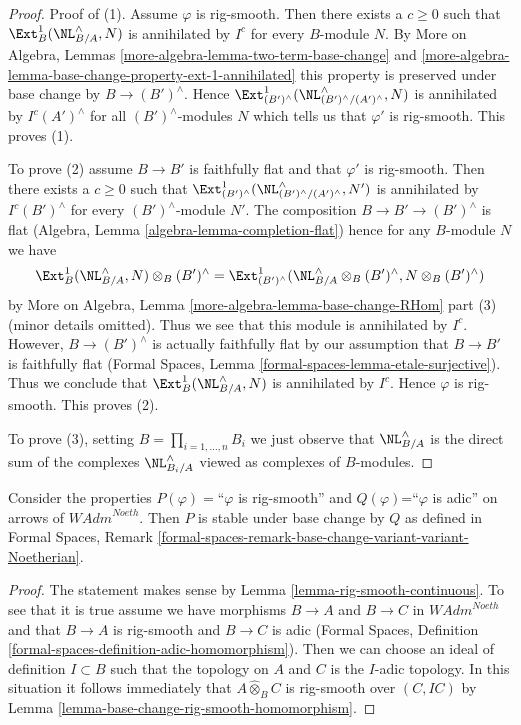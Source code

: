 \begin{proof}
\medskip\noindent
Proof of (1). Assume $\varphi$ is rig-smooth. Then there exists a $c \geq 0$
such that $\Ext^1_B(\NL_{B/A}^\wedge, N)$ is annihilated by $I^c$
for every $B$-module $N$. By
More on Algebra, Lemmas \ref{more-algebra-lemma-two-term-base-change} and
\ref{more-algebra-lemma-base-change-property-ext-1-annihilated}
this property is preserved under base change by $B \to (B')^\wedge$.
Hence $\Ext^1_{(B')^\wedge}(\NL_{(B')^\wedge/(A')^\wedge}^\wedge, N)$
is annihilated by $I^c(A')^\wedge$ for all $(B')^\wedge$-modules $N$
which tells us that $\varphi'$ is rig-smooth.
This proves (1).

\medskip\noindent
To prove (2) assume $B \to B'$ is faithfully flat and that $\varphi'$
is rig-smooth. Then there exists a $c \geq 0$ such that
$\Ext^1_{(B')^\wedge}(\NL_{(B')^\wedge/(A')^\wedge}^\wedge, N')$
is annihilated by $I^c(B')^\wedge$ for every $(B')^\wedge$-module $N'$.
The composition $B \to B' \to (B')^\wedge$ is flat
(Algebra, Lemma \ref{algebra-lemma-completion-flat})
hence for any $B$-module $N$ we have
$$
\Ext^1_B(\NL_{B/A}^\wedge, N) \otimes_B (B')^\wedge =
\Ext^1_{(B')^\wedge}(\NL_{B/A}^\wedge \otimes_B (B')^\wedge,
N \otimes_B (B')^\wedge)
$$
by More on Algebra, Lemma \ref{more-algebra-lemma-base-change-RHom} part (3)
(minor details omitted). Thus we see that this module is annihilated
by $I^c$. However, $B \to (B')^\wedge$ is actually faithfully flat
by our assumption that $B \to B'$ is faithfully flat (Formal Spaces, Lemma
\ref{formal-spaces-lemma-etale-surjective}). Thus we conclude that
$\Ext^1_B(\NL_{B/A}^\wedge, N)$ is annihilated by $I^c$.
Hence $\varphi$ is rig-smooth. This proves (2).

\medskip\noindent
To prove (3), setting $B = \prod_{i = 1, \ldots, n} B_i$
we just observe that $\NL_{B/A}^\wedge$ is the direct
sum of the complexes $\NL_{B_i/A}^\wedge$ viewed as complexes
of $B$-modules.
\end{proof}

\begin{lemma}
\label{lemma-base-change-rig-smooth-continuous}
Consider the properties $P(\varphi)=$``$\varphi$ is rig-smooth''
and $Q(\varphi)$=``$\varphi$ is adic'' on arrows of $\textit{WAdm}^{Noeth}$.
Then $P$ is stable under base change by $Q$ as defined in
Formal Spaces, Remark
\ref{formal-spaces-remark-base-change-variant-variant-Noetherian}.
\end{lemma}

\begin{proof}
The statement makes sense by Lemma \ref{lemma-rig-smooth-continuous}.
To see that it is true assume we have morphisms
$B \to A$ and $B \to C$ in $\textit{WAdm}^{Noeth}$
and that $B \to A$ is rig-smooth and $B \to C$ is adic
(Formal Spaces, Definition
\ref{formal-spaces-definition-adic-homomorphism}).
Then we can choose an ideal of definition $I \subset B$
such that the topology on $A$ and $C$ is the $I$-adic topology.
In this situation it follows immediately that
$A \widehat{\otimes}_B C$ is rig-smooth over $(C, IC)$ by
Lemma \ref{lemma-base-change-rig-smooth-homomorphism}.
\end{proof}

